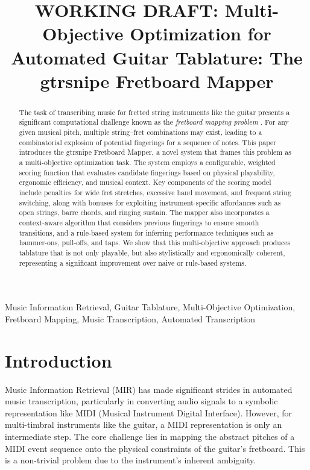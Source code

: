 \documentclass[conference]{IEEEtran}
\title{WORKING DRAFT: Multi-Objective Optimization for Automated Guitar Tablature: The gtrsnipe Fretboard Mapper}
\author{
\IEEEauthorblockN{Scott VanRavenswaay}
\IEEEauthorblockA{Email: scottvr@gmail.com}
}
\begin{document}
\maketitle

\begin{abstract}
The task of transcribing music for fretted string instruments like the guitar presents a significant computational challenge known as the \emph{fretboard mapping problem} \cite{mapping-problem}. For any given musical pitch, multiple string–fret combinations may exist, leading to a combinatorial explosion of potential fingerings for a sequence of notes. This paper introduces the gtrsnipe Fretboard Mapper, a novel system that frames this problem as a multi-objective optimization task. The system employs a configurable, weighted scoring function that evaluates candidate fingerings based on physical playability, ergonomic efficiency, and musical context. Key components of the scoring model include penalties for wide fret stretches, excessive hand movement, and frequent string switching, along with bonuses for exploiting instrument-specific affordances such as open strings, barre chords, and ringing sustain. The mapper also incorporates a context-aware algorithm that considers previous fingerings to ensure smooth transitions, and a rule-based system for inferring performance techniques such as hammer-ons, pull-offs, and taps. We show that this multi-objective approach produces tablature that is not only playable, but also stylistically and ergonomically coherent, representing a significant improvement over naive or rule-based systems.

\end{abstract}

\begin{IEEEkeywords}
Music Information Retrieval, Guitar Tablature, Multi-Objective Optimization, Fretboard Mapping, Music Transcription, Automated Transcription
\end{IEEEkeywords}

\section{Introduction}

Music Information Retrieval (MIR) has made significant strides in automated music transcription, particularly in converting audio signals to a symbolic representation like MIDI (Musical Instrument Digital Interface). However, for multi-timbral instruments like the guitar, a MIDI representation is only an intermediate step. The core challenge lies in mapping the abstract pitches of a MIDI event sequence onto the physical constraints of the guitar's fretboard. This is a non-trivial problem due to the instrument's inherent ambiguity.
\end{document}
